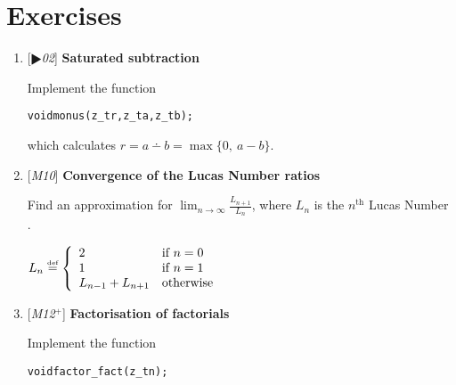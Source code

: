 \chapter{Exercises}
\label{chap:Exercises}

% 
% 
% 
% 


\begin{enumerate}[label=\textbf{\arabic*}.]



\item {[$\RHD$\textit{02}]} \textbf{Saturated subtraction}

Implement the function

\vspace{-1em}
\begin{alltt}
   void monus(z_t r, z_t a, z_t b);
\end{alltt}
\vspace{-1em}

\noindent
which calculates $r = a \dotminus b = \max \{ 0,~ a - b \}$.



\item {[\textit{M10}]} \textbf{Convergence of the Lucas Number ratios}

Find an approximation for
$\displaystyle{ \lim_{n \to \infty} \frac{L_{n + 1}}{L_n}}$,
where $L_n$ is the $n^{\text{th}}$
Lucas Number .

\( \displaystyle{
    L_n \stackrel{\text{\tiny{def}}}{\text{=}} \left \{ \begin{array}{ll}
      2 & \text{if} ~ n = 0 \\
      1 & \text{if} ~ n = 1 \\
      L_{n - 1} + L_{n + 1} & \text{otherwise}
    \end{array} \right .
}\)



\item {[\textit{M12${}^+$}]} \textbf{Factorisation of factorials}

Implement the function

\vspace{-1em}
\begin{alltt}
   void factor_fact(z_t n);
\end{alltt}
\vspace{-1em}


\end{enumerate}
